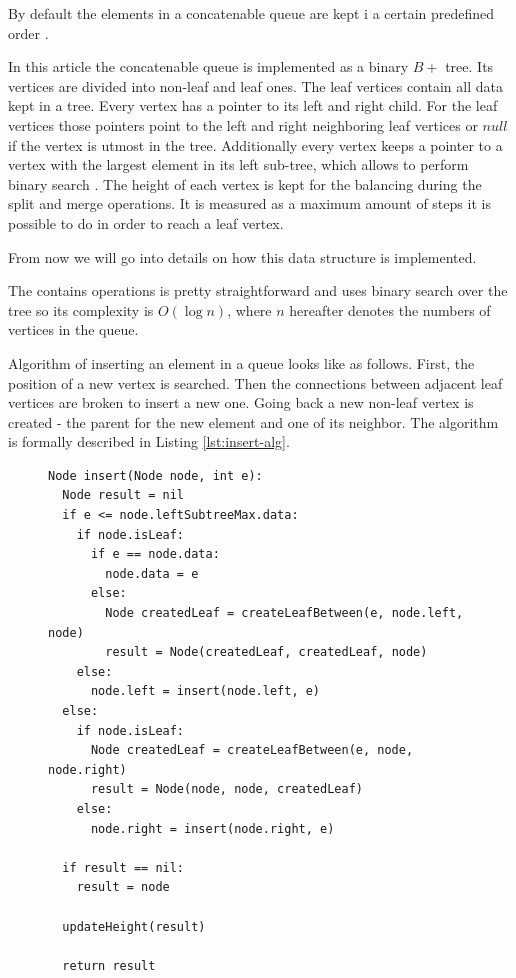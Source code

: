 \documentclass[conference]{IEEEtran}
\begin{document}
	By default the elements in a concatenable queue are kept i a certain predefined order \cite[pp..~155-157]{aho}.
	
	In this article the concatenable queue is implemented as a binary  $B+$ tree. Its vertices are divided into non-leaf and leaf ones. The leaf vertices contain all data kept in a tree. Every vertex has a pointer to its left and right child. For the leaf vertices those pointers point to the left and right neighboring leaf vertices or $null$ if the vertex is utmost in the tree. 
	Additionally every vertex keeps a pointer to a vertex with the largest element in its left sub-tree, which  allows to perform binary search \cite[pp..~155-157]{aho}. The height of each vertex is kept for the balancing during the split and merge operations. It is measured as a maximum amount of steps it is possible to do in order to reach a leaf vertex.
	
	From now we will go into details on how this data structure is implemented. 
	
	The contains operations is pretty straightforward and uses binary search over the tree so its complexity is $O(\log n)$, where $n$ hereafter denotes the numbers of vertices in the queue.
	
	Algorithm of inserting an element in a queue looks like as follows. First, the position of a new vertex is searched. Then the connections between adjacent leaf vertices are broken to insert a new one. Going back a new non-leaf vertex is created - the parent for the new element and one of its neighbor. The algorithm is formally described in Listing \ref{lst:insert-alg}.

		\begin{figure}[htbp]
			\begin{lstlisting}[caption={Queue insertion algorithm},label={lst:insert-alg},captionpos=b]
Node insert(Node node, int e):
  Node result = nil
  if e <= node.leftSubtreeMax.data:
  	if node.isLeaf:
  	  if e == node.data:
        node.data = e
  	  else:
        Node createdLeaf = createLeafBetween(e, node.left, node)
        result = Node(createdLeaf, createdLeaf, node)
    else:
      node.left = insert(node.left, e)
  else:
    if node.isLeaf:
      Node createdLeaf = createLeafBetween(e, node, node.right)
      result = Node(node, node, createdLeaf)
    else:
      node.right = insert(node.right, e)

  if result == nil:
  	result = node

  updateHeight(result)

  return result
			\end{lstlisting}
		\end{figure}
\end{document}
